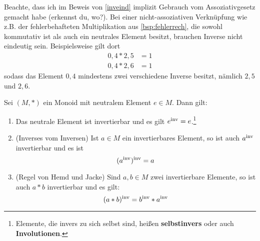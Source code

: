 \begin{bem}[*]
    Beachte, dass ich im Beweis von \cref{inveind} implizit Gebrauch vom Assoziativgesetz gemacht habe (erkennst du, wo?). Bei einer nicht-assoziativen Verknüpfung wie z.B. der fehlerbehafteten Multiplikation aus \cref{bsp:fehlerrech}, die sowohl kommutativ ist als auch ein neutrales Element besitzt, brauchen Inverse nicht eindeutig sein. Beispielsweise gilt dort
    \begin{align*}
        0{,}4 * 2{,}5 & = 1 \\
        0{,}4 * 2{,}6 & = 1
    \end{align*}
    sodass das Element $0{,}4$ mindestens zwei verschiedene Inverse besitzt, nämlich $2{,}5$ und $2{,}6$.
\end{bem}


\begin{satz} \label{regelnfuerinv} 
    Sei $(M,*)$ ein Monoid mit neutralem Element $e\in M$. Dann gilt:
    \begin{enumerate}
        \item Das neutrale Element ist invertierbar und es gilt $e^{\mathrm{inv}} = e$.\footnote{Elemente, die invers zu sich selbst sind, heißen \textbf{selbstinvers} oder auch \textbf{Involutionen}.}
        \item(Inverses vom Inversen) Ist $a\in M$ ein invertierbares Element, so ist auch $a^{\mathrm{inv}}$ invertierbar und es ist
            \[(a^{\mathrm{inv}})^{\mathrm{inv}} = a \]
        \item(Regel von Hemd und Jacke) Sind $a,b\in M$ zwei invertierbare Elemente, so ist auch $a*b$ invertierbar und es gilt:
            \[ (a*b)^{\mathrm{inv}} = b^{\mathrm{inv}} * a^{\mathrm{inv}} \]
    \end{enumerate}
\end{satz}


